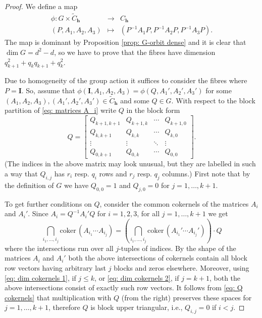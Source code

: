 \documentclass[11pt]{amsart}
\theoremstyle{definition}
\newcommand{\h}{\mathbf{h}}
\newcommand{\tC}{\widetilde{C}}
\newcommand{\II}{\mathbf{I}}
\begin{document}
\begin{proof}
We define a map
\begin{eqnarray*}
\phi\colon G\times \tC_\h&\to& C_ \h\\
(P,A_1,A_2,A_3)&\mapsto& (P^{-1}A_1P,P^{-1}A_2P,P^{-1}A_3P).
\end{eqnarray*}
The map is dominant by Proposition \ref{prop: G-orbit dense} and it is clear that $\dim G=d^2-d$, so we have to prove that the fibres have dimension $q_{k+1}^2+q_kq_{k+1}+q_k^2$.

Due to homogeneity of the group action it suffices to consider the fibres where $P=\II$. So, assume that $\phi(\II,A_1,A_2,A_3)=\phi(Q,A_1',A_2',A_3')$ for some $(A_1,A_2,A_3),(A_1',A_2',A_3')\in \tC_\h$ and some $Q\in G$. With respect to the block partition of \eqref{eq: matrices A_i} write $Q$ in the block form
$$Q=\begin{bmatrix}
Q_{k+1,k+1} & Q_{k+1,k} & \cdots & Q_{k+1,0}\\
Q_{k,k+1} & Q_{k,k} & \cdots & Q_{k,0}\\
\vdots & \vdots & \ddots & \vdots\\
Q_{0,k+1} & Q_{0,k} & \cdots & Q_{0,0}
\end{bmatrix}.$$
(The indices in the above matrix may look unusual, but they  are labelled in such a way that $Q_{i,j}$ has $r_i$ resp. $q_i$ rows and $r_j$ resp. $q_j$ columns.)
First note that by the definition of $G$ we have $Q_{0,0}=1$ and $Q_{j,0}=0$ for $j=1,\ldots ,k+1$.

To get further conditions on $Q$, consider the common cokernels of the matrices $A_i$ and $A_i'$. Since $A_i=Q^{-1}A_i'Q$ for $i=1,2,3$, for all $j=1,\ldots ,k+1$ we get
\begin{equation}\label{eq: Q cokernels}
\bigcap_{i_1,\ldots ,i_j}\mathrm{coker}\, (A_{i_1}\cdots A_{i_j})=\left(\bigcap_{i_1,\ldots ,i_j}\mathrm{coker}\, (A_{i_1}'\cdots A_{i_j}')\right)\cdot Q
\end{equation}
where the intersections run over all $j$-tuples of indices. By the shape of the matrices $A_i$ and $A_i'$ both the above intersections of cokernels contain all block row vectors having arbitrary last $j$ blocks and zeros elsewhere. Moreover, using \eqref{eq: dim cokernels 1}, if $j\le k$, or \eqref{eq: dim cokernels 2}, if $j=k+1$, both the above intersections consist of exactly such row vectors. It follows from \eqref{eq: Q cokernels} that multiplication with $Q$ (from the right) preserves these spaces for $j=1,\ldots ,k+1$, therefore $Q$ is block upper triangular, i.e., $Q_{i,j}=0$ if $i<j$.


\end{proof}
\end{document}
